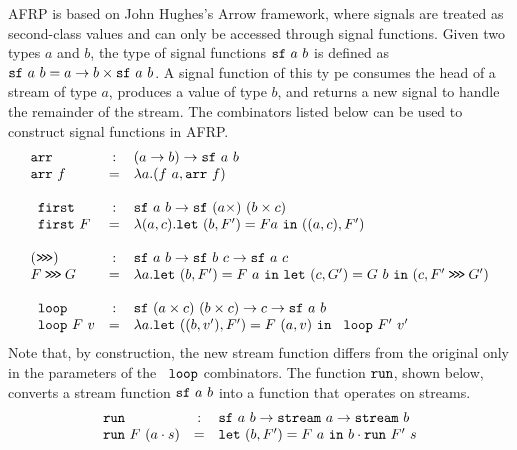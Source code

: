 AFRP is based on John Hughes's Arrow framework, where signals are treated as second-class values and can only be accessed through signal functions.
Given two types \(a\) and \(b\), the type of signal functions \({\tt{sf}}~a~b\)
is defined as ${\tt{sf}}~a~b = a \rightarrow b \times {\tt{sf}}~a~b$.
A signal function of this ty    pe consumes the head of a stream of type \(a\),
produces a value of type \(b\), and returns a new signal to handle the remainder of 
the stream. The combinators listed below can be used to construct signal functions in AFRP.
\begin{equation*}
    \begin{array}{lcl}
        \YArrow & : & (a \rightarrow b) \rightarrow \YSF{a}{b}\\
        \YArrow\ f & = & \lambda a. (f\ a, \YArrow\ f)\\\\
        \YFirst & : & \YSF{a}{b} \rightarrow \YSF{(a \times )}{(b\times c)}\\
        \YFirst\ F & = & \lambda (a,c). \letin{(b,F')}{F a}{((a,c), F')}\\\\ 
        (\YCompose) &:& \YSF{a}{b} \rightarrow \YSF{b}{c} \rightarrow \YSF{a}{c}\\
        F \YCompose G & = & \lambda a. \letin{(b,F')}{F\ a}{\letin{(c,G')}{G\ b}{(c, F' \YCompose G' )}}\\\\
        \YLoop & : & \YSF{(a \times c)}{(b \times c)} \rightarrow c \rightarrow \YSF{a}{b}\\
        \YLoop\ F\ v & = &  \lambda a. \letin{((b,v'), F')}{F\ (a,v)}{\YLoop\ F'\ v'}
    \end{array}
\end{equation*}
Note that, by construction, the new stream function differs from the original only in the parameters of the 
\(\texttt{ loop}\) combinators. 
The function \({\tt{run}}\), shown below, converts a stream function 
\({\tt{sf}}~a~b\) into a function that operates on streams.
\begin{equation}
    \begin{array}{lcl}
        {\tt{run}} & : & {\tt{sf}}~a~b \rightarrow {\tt{stream}}\ a \rightarrow {\tt{stream}}\ b\\
        {\tt{run}}\ F\ (a \cdot s) & = & {\tt{let}}~(b,F')=F\ a~{\tt{in}}~b \cdot {\tt{run}}\ F'\ s
    \end{array}
\end{equation}


